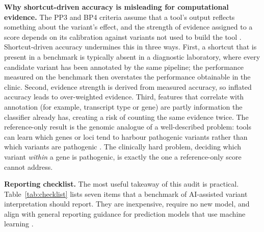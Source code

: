 \documentclass[11pt]{article}
\begin{document}
\textbf{Why shortcut-driven accuracy is misleading for computational evidence.} The PP3 and BP4 criteria assume that a tool's output reflects something about the variant's effect, and the strength of evidence assigned to a score depends on its calibration against variants not used to build the tool \citep{richards2015acmg,pejaver2022calibration}. Shortcut-driven accuracy undermines this in three ways. First, a shortcut that is present in a benchmark is typically absent in a diagnostic laboratory, where every candidate variant has been annotated by the same pipeline; the performance measured on the benchmark then overstates the performance obtainable in the clinic. Second, evidence strength is derived from measured accuracy, so inflated accuracy leads to over-weighted evidence. Third, features that correlate with annotation (for example, transcript type or gene) are partly information the classifier already has, creating a risk of counting the same evidence twice. The reference-only result is the genomic analogue of a well-described problem: tools can learn which genes or loci tend to harbour pathogenic variants rather than which variants are pathogenic \citep{grimm2015circularity}. The clinically hard problem, deciding which variant \emph{within} a gene is pathogenic, is exactly the one a reference-only score cannot address.

\textbf{Reporting checklist.} The most useful takeaway of this audit is practical. Table~\ref{tab:checklist} lists seven items that a benchmark of AI-assisted variant interpretation should report. They are inexpensive, require no new model, and align with general reporting guidance for prediction models that use machine learning \citep{collins2024tripod}.
\end{document}
